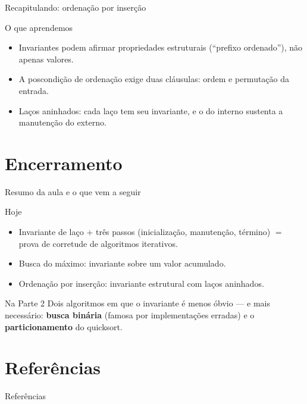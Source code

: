 \documentclass[aspectratio=169]{beamer}
\begin{document}
\begin{frame}{Recapitulando: ordenação por inserção}
  \begin{block}{O que aprendemos}
    \begin{itemize}
      \item Invariantes podem afirmar propriedades estruturais (``prefixo ordenado''),
        não apenas valores.
      \item A poscondição de ordenação exige duas cláusulas: ordem e permutação da entrada.
      \item Laços aninhados: cada laço tem seu invariante, e o do interno sustenta a
        manutenção do externo.
    \end{itemize}
  \end{block}
\end{frame}

\section*{Encerramento}

\begin{frame}{Resumo da aula e o que vem a seguir}
  \begin{block}{Hoje}
    \begin{itemize}
      \item Invariante de laço $+$ três passos (inicialização, manutenção, término)
        $=$ prova de corretude de algoritmos iterativos.
      \item Busca do máximo: invariante sobre um valor acumulado.
      \item Ordenação por inserção: invariante estrutural com laços aninhados.
    \end{itemize}
  \end{block}
  \begin{exampleblock}{Na Parte 2}
    Dois algoritmos em que o invariante é menos óbvio --- e mais necessário:
    \textbf{busca binária} (famosa por implementações erradas) e o
    \textbf{particionamento} do quicksort.
  \end{exampleblock}
\end{frame}

\section*{Referências}
\begin{frame}[allowframebreaks]{Referências}
  \nocite{*}
  
  
\end{frame}
\end{document}
